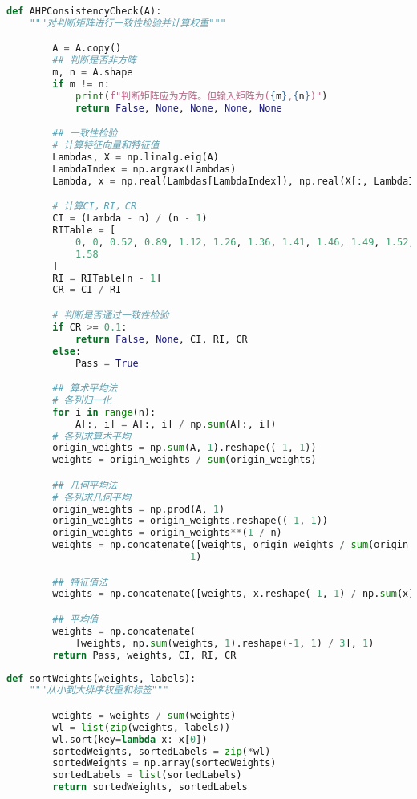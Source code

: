 \documentclass[withoutpreface]{cumcmthesis}
\begin{document}
    \begin{lstlisting}[language=python,caption={AHPConsistencyCheck函数}]
    def AHPConsistencyCheck(A):
    """对判断矩阵进行一致性检验并计算权重"""

        A = A.copy()
        ## 判断是否非方阵
        m, n = A.shape
        if m != n:
            print(f"判断矩阵应为方阵。但输入矩阵为({m},{n})")
            return False, None, None, None, None

        ## 一致性检验
        # 计算特征向量和特征值
        Lambdas, X = np.linalg.eig(A)
        LambdaIndex = np.argmax(Lambdas)
        Lambda, x = np.real(Lambdas[LambdaIndex]), np.real(X[:, LambdaIndex])

        # 计算CI，RI，CR
        CI = (Lambda - n) / (n - 1)
        RITable = [
            0, 0, 0.52, 0.89, 1.12, 1.26, 1.36, 1.41, 1.46, 1.49, 1.52, 1.54, 1.56,
            1.58
        ]
        RI = RITable[n - 1]
        CR = CI / RI

        # 判断是否通过一致性检验
        if CR >= 0.1:
            return False, None, CI, RI, CR
        else:
            Pass = True

        ## 算术平均法
        # 各列归一化
        for i in range(n):
            A[:, i] = A[:, i] / np.sum(A[:, i])
        # 各列求算术平均
        origin_weights = np.sum(A, 1).reshape((-1, 1))
        weights = origin_weights / sum(origin_weights)

        ## 几何平均法
        # 各列求几何平均
        origin_weights = np.prod(A, 1)
        origin_weights = origin_weights.reshape((-1, 1))
        origin_weights = origin_weights**(1 / n)
        weights = np.concatenate([weights, origin_weights / sum(origin_weights)],
                                1)

        ## 特征值法
        weights = np.concatenate([weights, x.reshape(-1, 1) / np.sum(x)], 1)

        ## 平均值
        weights = np.concatenate(
            [weights, np.sum(weights, 1).reshape(-1, 1) / 3], 1)
        return Pass, weights, CI, RI, CR
    \end{lstlisting}
    
    \begin{lstlisting}[language=python,caption={sortWeights函数}]
    def sortWeights(weights, labels):
    """从小到大排序权重和标签"""

        weights = weights / sum(weights)
        wl = list(zip(weights, labels))
        wl.sort(key=lambda x: x[0])
        sortedWeights, sortedLabels = zip(*wl)
        sortedWeights = np.array(sortedWeights)
        sortedLabels = list(sortedLabels)
        return sortedWeights, sortedLabels
    \end{lstlisting}
\end{document}
